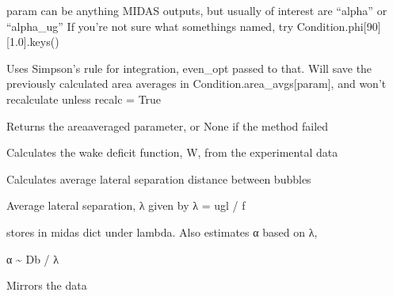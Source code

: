 \documentclass[letterpaper,10pt,english]{sphinxmanual}
\begin{document}
\begin{fulllineitems}
\begin{fulllineitems}
\sphinxAtStartPar
param can be anything MIDAS outputs, but usually of interest are “alpha” or “alpha\_ug”
If you’re not sure what somethings named, try Condition.phi{[}90{]}{[}1.0{]}.keys()

\sphinxAtStartPar
Uses Simpson’s rule for integration, even\_opt passed to that. Will save the previously calculated area averages
in Condition.area\_avgs{[}param{]}, and won’t recalculate unless recalc = True

\sphinxAtStartPar
Returns the area\sphinxhyphen{}averaged parameter, or None if the method failed

\end{fulllineitems}


\begin{fulllineitems}
\label{\detokenize{api/MARIGOLD.Condition:MARIGOLD.Condition.calc_W}}
\pysigstartsignatures
{}
\pysigstopsignatures
\sphinxAtStartPar
Calculates the wake deficit function, W, from the experimental data

\end{fulllineitems}


\begin{fulllineitems}
\label{\detokenize{api/MARIGOLD.Condition:MARIGOLD.Condition.calc_avg_lat_sep}}
\pysigstartsignatures
{}
\pysigstopsignatures
\sphinxAtStartPar
Calculates average lateral separation distance between bubbles

\sphinxAtStartPar
Average lateral separation, λ given by
λ = ugl / f

\sphinxAtStartPar
stores in midas dict under lambda. Also estimates α based on λ,

\sphinxAtStartPar
α \textasciitilde{} Db / λ

\sphinxAtStartPar
Mirrors the data

\end{fulllineitems}



\end{fulllineitems}
\end{document}

